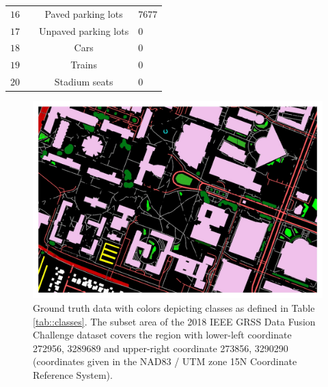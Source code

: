 \documentclass[journal]{IEEEtran}
\begin{document}
\begin{table}
\begin{tabular}{NNcZ}
$16$ & \colorbox[rgb]{1.,1.,0.}{\textcolor{white}{\phantom{A}}} & Paved parking lots & $7677$ \\
$17$ & \colorbox[rgb]{0.92, 0.44, 0.}{\textcolor{white}{\phantom{A}}} & Unpaved parking lots & $0$ \\
$18$ & \colorbox[rgb]{0.98, 0.  , 1.}{\textcolor{white}{\phantom{A}}} & Cars & $0$ \\
$19$ & \colorbox[rgb]{0.  , 0.  , 1.}{\textcolor{white}{\phantom{A}}} & Trains & $0$ \\
$20$ & \colorbox[rgb]{0.49, 0.76, 0.8}{\textcolor{white}{\phantom{A}}} & Stadium seats & $0$ \\
\hline
\end{tabular}
\end{table}

\begin{figure}[!t]
\centering
\includegraphics[width=\columnwidth]{figures/gt.jpg}
\caption{Ground truth data with colors depicting classes as defined in Table \ref{tab::classes}. The subset area of the 2018 IEEE GRSS Data Fusion Challenge dataset covers the region with lower-left coordinate 272956, 3289689 and upper-right coordinate 273856, 3290290 (coordinates given in the NAD83 / UTM zone 15N Coordinate Reference System).}
\label{fig::gt}
\end{figure}
\end{document}
